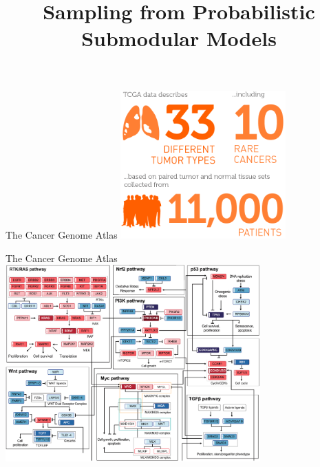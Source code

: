 \documentclass[mathserif]{beamer}
\title[Sampling from Probabilistic Submodular Models]
{Sampling from Probabilistic Submodular Models}
\author[Alkis Gotovos]{}
\begin{document}



\begin{frame}{The Cancer Genome Atlas}
\vspace{0.5em}
\centering
\includegraphics[width=2.5in]{figures/tcga.png}\\[-0.3em]
\hspace{12em}
\end{frame}

\begin{frame}{The Cancer Genome Atlas}
\vspace{0.5em}
\centering
\includegraphics[width=3.85in]{figures/pathways_new.png}\\[-0.7em]
\hspace{22em}
\end{frame}
\end{document}
